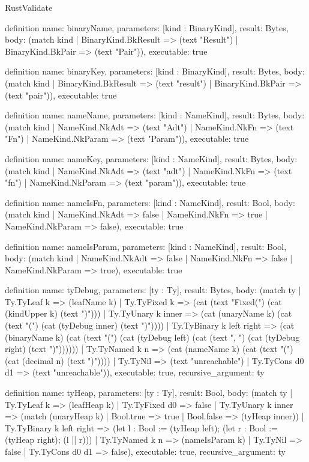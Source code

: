 \begin{lexlean}{RustValidate}
\begin{semanticmodule}
definition{
  name: binaryName,
  parameters: [kind : BinaryKind],
  result: Bytes,
  body: (match kind | BinaryKind.BkResult => (text "Result") | BinaryKind.BkPair => (text "Pair")),
  executable: true
}

definition{
  name: binaryKey,
  parameters: [kind : BinaryKind],
  result: Bytes,
  body: (match kind | BinaryKind.BkResult => (text "result") | BinaryKind.BkPair => (text "pair")),
  executable: true
}

definition{
  name: nameName,
  parameters: [kind : NameKind],
  result: Bytes,
  body: (match kind
    | NameKind.NkAdt => (text "Adt")
    | NameKind.NkFn => (text "Fn")
    | NameKind.NkParam => (text "Param")),
  executable: true
}

definition{
  name: nameKey,
  parameters: [kind : NameKind],
  result: Bytes,
  body: (match kind
    | NameKind.NkAdt => (text "adt")
    | NameKind.NkFn => (text "fn")
    | NameKind.NkParam => (text "param")),
  executable: true
}

definition{
  name: nameIsFn,
  parameters: [kind : NameKind],
  result: Bool,
  body: (match kind | NameKind.NkAdt => false | NameKind.NkFn => true | NameKind.NkParam => false),
  executable: true
}

definition{
  name: nameIsParam,
  parameters: [kind : NameKind],
  result: Bool,
  body: (match kind | NameKind.NkAdt => false | NameKind.NkFn => false | NameKind.NkParam => true),
  executable: true
}

definition{
  name: tyDebug,
  parameters: [ty : Ty],
  result: Bytes,
  body: (match ty
    | Ty.TyLeaf k => (leafName k)
    | Ty.TyFixed k => (cat (text "Fixed(") (cat (kindUpper k) (text ")")))
    | Ty.TyUnary k inner => (cat (unaryName k) (cat (text "(") (cat (tyDebug inner) (text ")"))))
    | Ty.TyBinary k left right => (cat (binaryName k) (cat (text "(") (cat (tyDebug left) (cat (text ", ") (cat (tyDebug right) (text ")"))))))
    | Ty.TyNamed k n => (cat (nameName k) (cat (text "(") (cat (decimal n) (text ")"))))
    | Ty.TyNil => (text "unreachable")
    | Ty.TyCons d0 d1 => (text "unreachable")),
  executable: true,
  recursive_argument: ty
}

definition{
  name: tyHeap,
  parameters: [ty : Ty],
  result: Bool,
  body: (match ty
    | Ty.TyLeaf k => (leafHeap k)
    | Ty.TyFixed d0 => false
    | Ty.TyUnary k inner => (match (unaryHeap k) | Bool.true => true | Bool.false => (tyHeap inner))
    | Ty.TyBinary k left right => (let l : Bool := (tyHeap left); (let r : Bool := (tyHeap right); (l || r)))
    | Ty.TyNamed k n => (nameIsParam k)
    | Ty.TyNil => false
    | Ty.TyCons d0 d1 => false),
  executable: true,
  recursive_argument: ty
}


\end{semanticmodule}
\end{lexlean}
